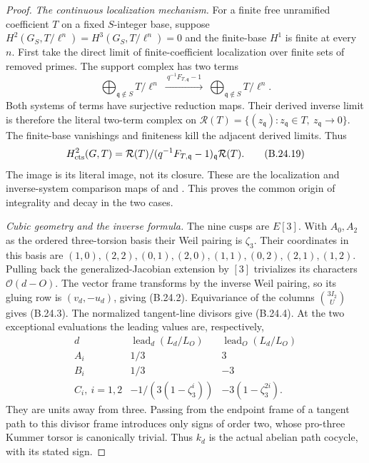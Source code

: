 \begin{proof}
\emph{The continuous localization mechanism.}
For a finite free unramified coefficient $T$ on a fixed
$S$-integer base, suppose
$H^2(G_S,T/\ell^n)=H^3(G_S,T/\ell^n)=0$ and the finite-base
$H^1$ is finite at every $n$. First take the direct limit
of finite-coefficient localization over finite sets of
removed primes. The support complex has two terms
\[
 \bigoplus_{\mathfrak q\notin S} T/\ell^n
   \ \xrightarrow{\ q^{-1}F_{T,\mathfrak q}-1\ }\
 \bigoplus_{\mathfrak q\notin S} T/\ell^n .
\]
Both systems of terms have surjective reduction maps.
Their derived inverse limit is therefore the literal
two-term complex on
$\mathcal R(T)=\{(z_{\mathfrak q}):z_{\mathfrak q}\in T,\
z_{\mathfrak q}\to0\}$. The finite-base vanishings and
finiteness kill the adjacent derived limits. Thus
\[
 H^2_{\rm cts}(G,T)=
 \mathcal R(T)/
 (q^{-1}F_{T,\mathfrak q}-1)_{\mathfrak q}\mathcal R(T).
                                                               \tag{B.24.19}
\]
The image is its literal image, not its closure.
These are the localization and inverse-system comparison
maps of \citet[II.0.1, II.1.7, II.2.9]{BMilne2006}
and \citet[Proposition 1.6, Theorem 2.2]{BJannsen1988}.
This proves the common origin of integrality and decay
in the two cases.

\emph{Cubic geometry and the inverse formula.}
The nine cusps are $E[3]$. With $A_0,A_2$ as the ordered
three-torsion basis their Weil pairing is $\zeta_3$.
Their coordinates in this basis are
$(1,0),(2,2),(0,1),(2,0),(1,1),(0,2),(2,1),(1,2)$.
Pulling back the generalized-Jacobian extension by $[3]$
trivializes its characters $\mathcal O(d-O)$.
The vector frame transforms by the inverse Weil pairing,
so its gluing row is $(v_d,-u_d)$, giving (B.24.2).
Equivariance of the columns $\binom{3I_2}{U}$ gives
(B.24.3). The normalized tangent-line divisors give
(B.24.4). At the two exceptional evaluations the leading
values are, respectively,
\[
 \begin{array}{c|cc}
 d&\operatorname{lead}_d(L_d/L_O)&
           \operatorname{lead}_O(L_d/L_O)\\ \hline
 A_i&1/3&3\\
 B_i&1/3&-3\\
 C_i,\ i=1,2&-1/(3(1-\zeta_3^i))&
                       -3(1-\zeta_3^{2i}).
 \end{array}
\]
They are units away from three. Passing from the endpoint
frame of a tangent path to this divisor frame introduces
only signs of order two, whose pro-three Kummer torsor is
canonically trivial. Thus $k_d$ is the actual abelian
path cocycle, with its stated sign.


\end{proof}

